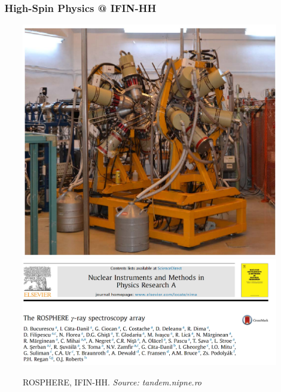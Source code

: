 \documentclass{beamer}
\begin{document}
\begin{frame}
	\frametitle{\faSearch\ High-Spin Physics @ IFIN-HH}
		\begin{figure}
		\centering
		\includegraphics[scale=0.33]{figures/ro-sphere.pdf}
		\includegraphics[scale=0.15]{figures/rosphere-paper.png}
		\caption{ROSPHERE, IFIN-HH. \textit{Source: tandem.nipne.ro}}
	\end{figure}
\end{frame}
\end{document}
